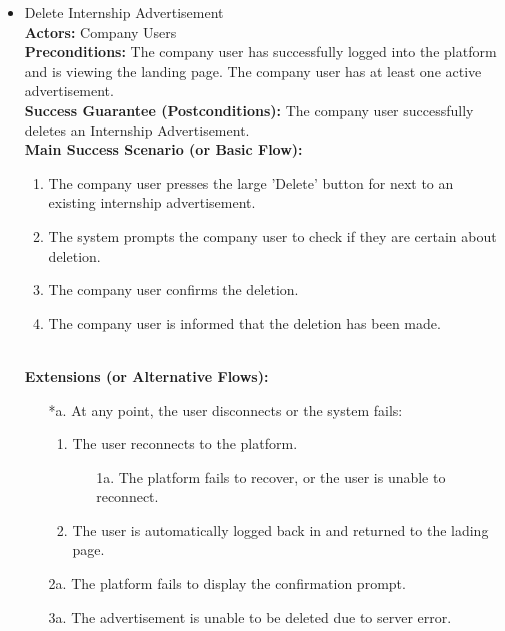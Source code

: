 \begin{itemize}[label={[\textbf{UC}]}, align=left, leftmargin=*]
     \item {} Delete Internship Advertisement \\
     \textbf{Actors:} Company Users\\
     \textbf{Preconditions:} The company user has successfully logged into the platform and is viewing the landing page. The company user has at least one active advertisement.\\
     \textbf{Success Guarantee (Postconditions):} The company user successfully deletes an Internship Advertisement. \\
     \textbf{Main Success Scenario (or Basic Flow):} 
     \begin{enumerate}[label=\arabic*.] 
        \item The company user presses the large 'Delete' button for next to an existing internship advertisement. 
        \item The system prompts the company user to check if they are certain about deletion. 
        \item The company user confirms the deletion.
        \item The company user is informed that the deletion has been made. 
     \end{enumerate} \\

    \textbf{Extensions (or Alternative Flows):} 
    \begin{enumerate}[label=\arabic*.]
        \item[*a.] At any point, the user disconnects or the system fails:
            \begin{enumerate}[label=\arabic*.]
                \item The user reconnects to the platform.
                    \begin{enumerate}[label=\alph*.]
                        \item[1a.] The platform fails to recover, or the user is unable to reconnect.
                    \end{enumerate}
                 \item The user is automatically logged back in and returned to the lading page.
            \end{enumerate}
        \item[2a.] The platform fails to display the confirmation prompt.
        \item[3a.] The advertisement is unable to be deleted due to server error.
        \end{enumerate}
     
\end{itemize}

